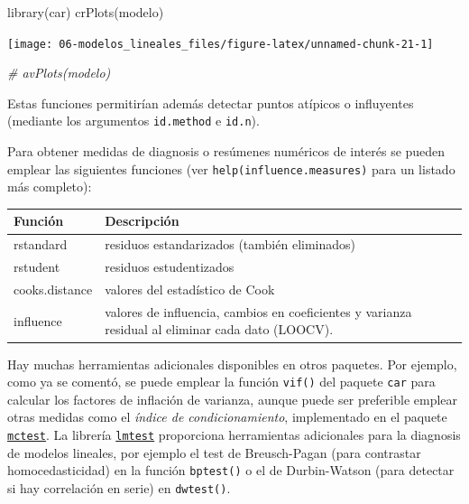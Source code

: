 \documentclass[
]{book}
\newenvironment{Shaded}{\begin{snugshade}}{\end{snugshade}}
\newcommand{\CommentTok}[1]{\textcolor[rgb]{0.56,0.35,0.01}{\textit{#1}}}
\newcommand{\FunctionTok}[1]{\textcolor[rgb]{0.00,0.00,0.00}{#1}}
\newcommand{\NormalTok}[1]{#1}
\theoremstyle{break}
\theoremstyle{definition}
\theoremstyle{definition}
\theoremstyle{definition}
\theoremstyle{definition}
\theoremstyle{remark}
\begin{document}
\begin{Shaded}
\begin{Highlighting}[]
\FunctionTok{library}\NormalTok{(car)}
\FunctionTok{crPlots}\NormalTok{(modelo)}
\end{Highlighting}
\end{Shaded}

\begin{center}\texttt{[image: 06-modelos\_lineales\_files/figure-latex/unnamed-chunk-21-1]} \end{center}

\begin{Shaded}
\begin{Highlighting}[]
\CommentTok{\# avPlots(modelo)}
\end{Highlighting}
\end{Shaded}

Estas funciones permitirían además detectar puntos atípicos o influyentes
(mediante los argumentos \texttt{id.method} e \texttt{id.n}).

Para obtener medidas de diagnosis o resúmenes numéricos de interés se pueden emplear
las siguientes funciones (ver \texttt{help(influence.measures)} para un listado más completo):

\begin{longtable}[]{@{}
  >{\raggedright\arraybackslash}p{}
  >{\raggedright\arraybackslash}p{}@{}}
\toprule
Función & Descripción \\
\midrule
\endhead
rstandard & residuos estandarizados (también eliminados) \\
rstudent & residuos estudentizados \\
cooks.distance & valores del estadístico de Cook \\
influence & valores de influencia, cambios en coeficientes y varianza residual al eliminar cada dato (LOOCV). \\
\bottomrule
\end{longtable}

Hay muchas herramientas adicionales disponibles en otros paquetes.
Por ejemplo, como ya se comentó, se puede emplear la función
\texttt{vif()} del paquete \texttt{car} para calcular los factores de inflación de varianza,
aunque puede ser preferible emplear otras medidas como el \emph{índice de condicionamiento},
implementado en el paquete \href{https://CRAN.R-project.org/package=mctest}{\texttt{mctest}}.
La librería \href{https://CRAN.R-project.org/package=lmtest}{\texttt{lmtest}} proporciona herramientas adicionales para la diagnosis de modelos lineales,
por ejemplo el test de Breusch-Pagan (para contrastar homocedasticidad) en la función \texttt{bptest()}
o el de Durbin-Watson (para detectar si hay correlación en serie) en \texttt{dwtest()}.
\end{document}
